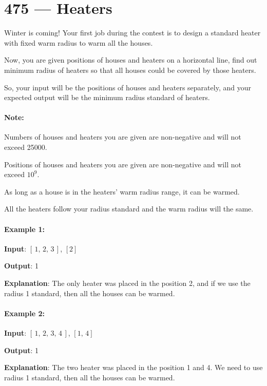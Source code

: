 \section{475 --- Heaters}
Winter is coming! Your first job during the contest is to design a standard heater with fixed warm radius to warm all the houses.

Now, you are given positions of houses and heaters on a horizontal line, find out minimum radius of heaters so that all houses could be covered by those heaters.

So, your input will be the positions of houses and heaters separately, and your expected output will be the minimum radius standard of heaters.

\paragraph{Note:}

\begin{flushleft}
\item Numbers of houses and heaters you are given are non-negative and will not exceed 25000.
\item Positions of houses and heaters you are given are non-negative and will not exceed $10^9$.
\item As long as a house is in the heaters' warm radius range, it can be warmed.
\item All the heaters follow your radius standard and the warm radius will the same.
\end{flushleft}
 

\paragraph{Example 1:}

\begin{flushleft}
\textbf{Input}: $[\,1,\,2,\,3\,]$, $[2]$

\textbf{Output}: 1

\textbf{Explanation}: The only heater was placed in the position 2, and if we use the radius 1 standard, then all the houses can be warmed.

\end{flushleft} 

\paragraph{Example 2:}

\begin{flushleft}
\textbf{Input}: $[\,1,\,2,\,3,\,4\,]$, $[1,\,4]$

\textbf{Output}: 1

\textbf{Explanation}: The two heater was placed in the position 1 and 4. We need to use radius 1 standard, then all the houses can be warmed.
\end{flushleft}

